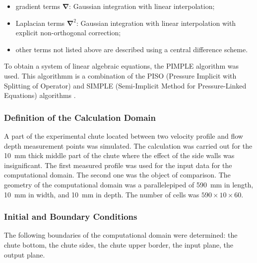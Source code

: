 \documentclass[sensors,article,submit,moreauthors,pdftex]{Definitions/mdpi}
\begin{document}
\begin{itemize}
	\item gradient terms $\boldsymbol{\nabla}$: Gaussian integration with linear interpolation;
	\item Laplacian terms $\boldsymbol{\nabla}^2$: Gaussian integration with linear interpolation with explicit non-orthogonal correction;
	\item other terms not listed above are described using a central difference scheme.
\end{itemize}

To obtain a system of linear algebraic equations, the PIMPLE \cite{Holzmann2019, Yin2003} algorithm was used. This algorithmm is a combination of the PISO (Pressure Implicit with Splitting of Operator) \cite{Issa1986_2} and SIMPLE (Semi-Implicit Method for Pressure-Linked Equations) algorithms \cite{Issa1986_1}.

\subsubsection{Definition of the Calculation Domain}

A part of the experimental chute located between two velocity profile and flow depth measurement points was simulated. The calculation was carried out for the 10~mm thick middle part of the chute where the effect of the side walls was insignificant. The first measured profile was used for the input data for the computational domain. The second one was the object of comparison. The geometry of the computational domain was a parallelepiped of 590~mm in length, 10~mm in width, and 10~mm in depth. The number of cells was $590 \times 10 \times 60$.

\subsubsection{Initial and Boundary Conditions}

The following boundaries of the computational domain were determined: the chute bottom, the chute sides, the chute upper border, the input plane, the output plane.
\end{document}
